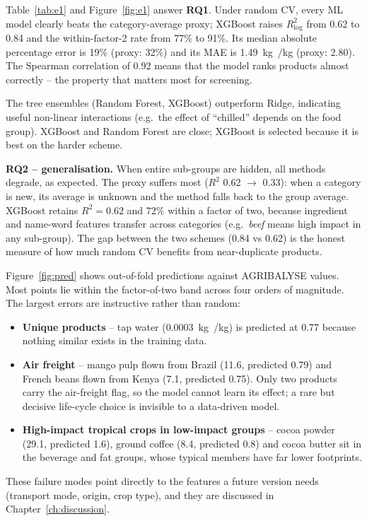 Table~\ref{tab:e1} and Figure~\ref{fig:e1} answer \textbf{RQ1}. Under random CV, every ML model
clearly beats the category-average proxy; XGBoost raises $R^2_{\log}$ from 0.62 to 0.84 and the
within-factor-2 rate from 77\% to 91\%. Its median absolute percentage error is 19\% (proxy: 32\%)
and its MAE is 1.49~kg~\co/kg (proxy: 2.80). The Spearman correlation of 0.92 means that the
model ranks products almost correctly -- the property that matters most for screening.

The tree ensembles (Random Forest, XGBoost) outperform Ridge, indicating useful non-linear
interactions (e.g.\ the effect of ``chilled'' depends on the food group). XGBoost and Random
Forest are close; XGBoost is selected because it is best on the harder scheme.

\textbf{RQ2 -- generalisation.} When entire sub-groups are hidden, all methods degrade, as
expected. The proxy suffers most ($R^2$ 0.62 $\rightarrow$ 0.33): when a category is new, its
average is unknown and the method falls back to the group average. XGBoost retains $R^2=0.62$
and 72\% within a factor of two, because ingredient and name-word features transfer across
categories (e.g.\ \emph{beef} means high impact in any sub-group). The gap between the two schemes
(0.84 vs 0.62) is the honest measure of how much random CV benefits from near-duplicate products.

Figure~\ref{fig:pred} shows out-of-fold predictions against AGRIBALYSE values. Most points lie
within the factor-of-two band across four orders of magnitude. The largest errors are
instructive rather than random:
\begin{itemize}
  \item \textbf{Unique products} -- tap water (0.0003~kg~\co/kg) is predicted at 0.77 because
  nothing similar exists in the training data.
  \item \textbf{Air freight} -- mango pulp flown from Brazil (11.6, predicted 0.79) and French
  beans flown from Kenya (7.1, predicted 0.75). Only two products carry the air-freight flag, so
  the model cannot learn its effect; a rare but decisive life-cycle choice is invisible to a
  data-driven model.
  \item \textbf{High-impact tropical crops in low-impact groups} -- cocoa powder (29.1, predicted
  1.6), ground coffee (8.4, predicted 0.8) and cocoa butter sit in the beverage and fat groups,
  whose typical members have far lower footprints.
\end{itemize}
These failure modes point directly to the features a future version needs (transport mode,
origin, crop type), and they are discussed in Chapter~\ref{ch:discussion}.

